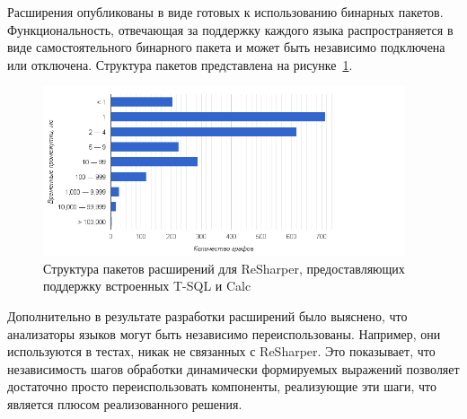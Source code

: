 Расширения опубликованы в виде готовых к использованию бинарных пакетов. Функциональность, отвечающая за поддержку каждого языка распространяется в виде самостоятельного бинарного пакета и может быть независимо подключена или отключена. Структура пакетов представлена на рисунке~\ref{fig:packagesStructure}.

\begin{figure}[H]
  \centering
 \includegraphics[width=0.95\textwidth]{pics/distr.png}
 \caption{Структура пакетов расширений для ReSharper, предоставляющих поддержку встроенных T-SQL и Calc}
 \label{fig:packagesStructure}
\end{figure}

Дополнительно в результате разработки расширений было выяснено, что анализаторы языков могут быть независимо переиспользованы. Например, они используются в тестах, никак не связанных с ReSharper. Это показывает, что независимость шагов обработки динамически формируемых выражений позволяет достаточно просто переиспользовать компоненты, реализующие эти шаги, что является плюсом реализованного решения.

